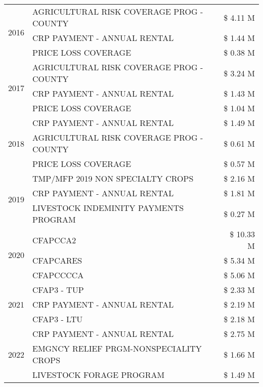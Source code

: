 \begin{tabular}{llr}
\cline{1-3}
\multirow[t]{3}{*}{2016} & AGRICULTURAL RISK COVERAGE PROG - COUNTY & \$ 4.11 M \\
 & CRP PAYMENT - ANNUAL RENTAL & \$ 1.44 M \\
 & PRICE LOSS COVERAGE & \$ 0.38 M \\
\cline{1-3}
\multirow[t]{3}{*}{2017} & AGRICULTURAL RISK COVERAGE PROG - COUNTY & \$ 3.24 M \\
 & CRP PAYMENT - ANNUAL RENTAL & \$ 1.43 M \\
 & PRICE LOSS COVERAGE & \$ 1.04 M \\
\cline{1-3}
\multirow[t]{3}{*}{2018} & CRP PAYMENT - ANNUAL RENTAL & \$ 1.49 M \\
 & AGRICULTURAL RISK COVERAGE PROG - COUNTY & \$ 0.61 M \\
 & PRICE LOSS COVERAGE & \$ 0.57 M \\
\cline{1-3}
\multirow[t]{3}{*}{2019} & TMP/MFP 2019 NON SPECIALTY CROPS & \$ 2.16 M \\
 & CRP PAYMENT - ANNUAL RENTAL & \$ 1.81 M \\
 & LIVESTOCK INDEMINITY PAYMENTS PROGRAM & \$ 0.27 M \\
\cline{1-3}
\multirow[t]{3}{*}{2020} & CFAPCCA2 & \$ 10.33 M \\
 & CFAPCARES & \$ 5.34 M \\
 & CFAPCCCCA & \$ 5.06 M \\
\cline{1-3}
\multirow[t]{3}{*}{2021} & CFAP3 - TUP & \$ 2.33 M \\
 & CRP PAYMENT - ANNUAL RENTAL & \$ 2.19 M \\
 & CFAP3 - LTU & \$ 2.18 M \\
\cline{1-3}
\multirow[t]{3}{*}{2022} & CRP PAYMENT - ANNUAL RENTAL & \$ 2.75 M \\
 & EMGNCY RELIEF PRGM-NONSPECIALITY CROPS & \$ 1.66 M \\
 & LIVESTOCK FORAGE PROGRAM & \$ 1.49 M \\
\cline{1-3}
\bottomrule
\end{tabular}
